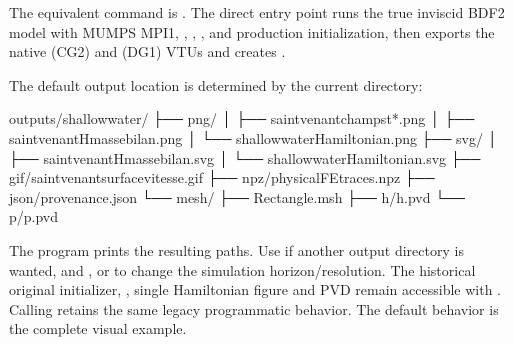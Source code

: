 \documentclass[letterpaper,10pt,english]{sphinxmanual}
\begin{document}
\sphinxAtStartPar
The equivalent command is
. The direct entry point
runs the true inviscid BDF2 model with MUMPS MPI1,
, , ,
and production  initialization, then
exports the native  (CG2) and  (DG1) VTUs and creates
.

\sphinxAtStartPar
The default output location is determined by the current directory:

\begin{sphinxVerbatim}[commandchars=\\\{\}]
outputs/shallow\PYGZus{}water/
├── png/
│   ├── saint\PYGZus{}venant\PYGZus{}champs\PYGZus{}t*.png
│   ├── saint\PYGZus{}venant\PYGZus{}H\PYGZus{}masse\PYGZus{}bilan.png
│   └── shallow\PYGZus{}water\PYGZus{}Hamiltonian.png
├── svg/
│   ├── saint\PYGZus{}venant\PYGZus{}H\PYGZus{}masse\PYGZus{}bilan.svg
│   └── shallow\PYGZus{}water\PYGZus{}Hamiltonian.svg
├── gif/saint\PYGZus{}venant\PYGZus{}surface\PYGZus{}vitesse.gif
├── npz/physical\PYGZus{}FE\PYGZus{}traces.npz
├── json/provenance.json
└── mesh/
    ├── Rectangle.msh
    ├── h/h.pvd
    └── p/p.pvd
\end{sphinxVerbatim}

\sphinxAtStartPar
The program prints the resulting paths. Use 
if another output directory is wanted, and ,
 or  to change the simulation
horizon/resolution. The historical original  initializer,
, single Hamiltonian figure and  PVD
remain accessible with
. Calling
 retains the same legacy
programmatic behavior. The default  behavior is
the complete visual example.
\end{document}

